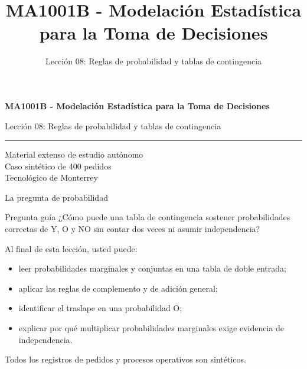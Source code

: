 \documentclass[aspectratio=169,10pt,spanish]{beamer}
\title{MA1001B - Modelación Estadística para la Toma de Decisiones}
\subtitle{Lección 08: Reglas de probabilidad y tablas de contingencia}
\author{}
\institute{Tecnol\'ogico de Monterrey}
\date{}
\begin{document}
\begin{frame}[plain]
  \vspace{1.2cm}
  {\Large\bfseries MA1001B - Modelación Estadística para la Toma de Decisiones\par}
  \vspace{0.7cm}
  {\large Lección 08: Reglas de probabilidad y tablas de contingencia\par}
  \vspace{0.7cm}
  {\color{TecRojo}\rule{\textwidth}{1.2pt}}
  \vspace{0.8cm}

  Material extenso de estudio autónomo\\[0.3cm]
  Caso sintético de 400 pedidos\\[0.3cm]
  Tecnol\'ogico de Monterrey
\end{frame}

\begin{frame}{La pregunta de probabilidad}
  \begin{alertblock}{Pregunta guía}
    ¿Cómo puede una tabla de contingencia sostener probabilidades correctas de
    Y, O y NO sin contar dos veces ni asumir independencia?
  \end{alertblock}

  \vspace{0.4em}
  Al final de esta lección, usted puede:
  \begin{itemize}
    \item leer probabilidades marginales y conjuntas en una tabla de doble entrada;
    \item aplicar las reglas de complemento y de adición general;
    \item identificar el traslape en una probabilidad O;
    \item explicar por qué multiplicar probabilidades marginales exige evidencia
      de independencia.
  \end{itemize}

  \vfill
  \scriptsize Todos los registros de pedidos y procesos operativos son sintéticos.
\end{frame}
\end{document}
